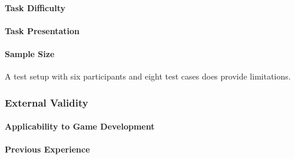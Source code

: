 \paragraph{Task Difficulty}

\paragraph{Task Presentation}

\paragraph{Sample Size}
A test setup with six participants and eight test cases does provide limitations.

\subsubsection{External Validity}
\metasheep

\paragraph{Applicability to Game Development}

\paragraph{Previous Experience}

